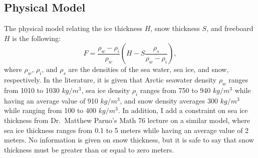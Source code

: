 \documentclass[12pt, letterpaper]{article}
\begin{document}
\subsection{Physical Model}
The physical model relating the ice thickness $H$, snow thickness $S$, and freeboard $H$ is the following:
\[
    F = \frac{\rho_w - \rho_i}{\rho_w} \left( H - S \frac{\rho_s}{\rho_w - \rho_i} \right),
\]
where $\rho_w$, $\rho_i$, and $\rho_s$ are the densities of the sea water, sea ice, and snow, respectively.
In the literature, it is given that Arctic seawater density $\rho_w$ ranges from 1010 to 1030 $kg/m^3$,
sea ice density $\rho_i$ ranges from 750 to 940 $kg/m^3$ while having an average value of 910 $kg / m^3$,
and snow density averages 300 $kg / m^3$ while ranging from 100 to 400 $kg / m^3$. In addition, I add a constraint
on sea ice thickness from Dr.\ Matthew Parno's Math 76 lecture on a similar model, where sea ice thickness ranges
from 0.1 to 5 meters while having an average value of 2 meters. No information is given on snow thickness, but it
is safe to say that snow thickness must be greater than or equal to zero meters.
\end{document}
